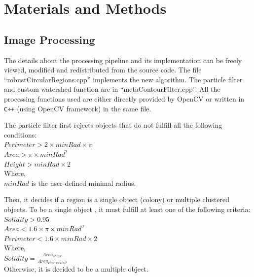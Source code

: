 \documentclass[10pt]{article}
\begin{document}
\section*{Materials and Methods} 

\subsection*{Image Processing} The details
about the processing pipeline and its implementation can be freely viewed,
modified and redistributed from the source code. The file
``robustCircularRegions.cpp'' implements the new algorithm. The particle filter
and custom watershed function are in ``metaContourFilter.cpp''.
All the processing functions used are either directly provided by OpenCV or
written in \texttt{C++} (using OpenCV framework) in the same file.

The particle filter first rejects objects that do not fulfill all the following conditions:\\
\newline{}
$Perimeter > 2\times{}minRad\times{}\pi $\\
$Area > \pi\times{}{minRad}^2$\\
$Height > minRad\times{}2$\\
\newline{}
Where,\\ 
$minRad$ is the user-defined minimal radius.

Then, it decides if a region is a single object (colony) or multiple clustered
objects. To be a single object
, it must fulfill at least one of the following
criteria:\\
\newline{}
$Solidity > 0.95$\\
$Area <  1.6 \times{}\pi\times{}{minRad}^2$\\
$Perimeter < 1.6 \times{} minRad\times{}2$\\
\newline{}
Where,\\ $Solidity = \frac{Area_{shape}}{Area_{ConvexHull}}$\\
\newline{}
Otherwise, it is decided to be a multiple object.\\
\end{document}
